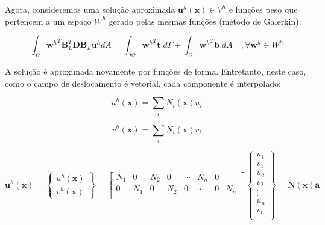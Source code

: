         Agora, consideremos uma solução aproximada $\mathbf{u}^h(\mathbf{x}) \in V^h$ e funções peso que pertencem a um espaço $W^h$ gerado pelas mesmas funções (método de Galerkin):

        \begin{equation}
            \int_\Omega {\mathbf{w}^h}^T \mathbf{B}_L^T \mathbf{D} \mathbf{B}_L \mathbf{u}^h dA = \int_{\partial \Omega} {\mathbf{w}^h}^T \mathbf{t} \; d\Gamma + \int_\Omega {\mathbf{w}^h}^T \mathbf{b} \; dA \quad, \forall \mathbf{w}^h \in W^h
        \end{equation}

        A solução é aproximada novamente por funções de forma. Entretanto, neste caso, como o campo de deslocamento é vetorial, cada componente é interpolado:

        \begin{equation}
            u^h(\mathbf{x}) = \sum_i N_i(\mathbf{x}) u_i
        \end{equation}

        \begin{equation}
            v^h(\mathbf{x}) = \sum_i N_i(\mathbf{x}) v_i
        \end{equation}

        \begin{equation}
            \mathbf{u}^h(\mathbf{x}) = 
            \begin{Bmatrix}
                u^h(\mathbf{x})\\
                v^h(\mathbf{x})
            \end{Bmatrix} =
            \begin{bmatrix}
                N_1 & 0 & N_2 & 0 & \cdots & N_n & 0\\
                0 & N_1 & 0 & N_2 & 0 & \cdots & 0 & N_n\\
            \end{bmatrix}
            \begin{Bmatrix}
                u_1\\
                v_1\\
                u_2\\
                v_2\\
                \vdots\\
                u_n\\
                v_n\\
            \end{Bmatrix} =
            \mathbf{N}(\mathbf{x})
            \mathbf{a}
        \end{equation}

